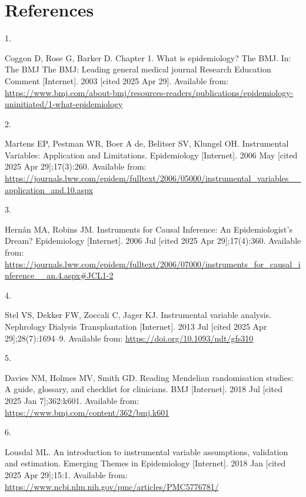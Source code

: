 \documentclass[
]{article}
\newlength{\cslhangindent}
\newlength{\csllabelwidth}
\newenvironment{CSLReferences}[2] %
 {\begin{list}{}{%
  \setlength{\itemindent}{0pt}
  \setlength{\leftmargin}{0pt}
  \setlength{\parsep}{0pt}
  \ifodd #1
   \setlength{\leftmargin}{\cslhangindent}
   \setlength{\itemindent}{-1\cslhangindent}
  \fi
  \setlength{\itemsep}{#2\baselineskip}}}
 {\end{list}}
\newcommand{\CSLLeftMargin}[1]{\parbox[t]{\csllabelwidth}{\strut#1\strut}}
\newcommand{\CSLRightInline}[1]{\parbox[t]{\linewidth - \csllabelwidth}{\strut#1\strut}}
\begin{document}
\section{References}\label{references}

\label{refs}
\begin{CSLReferences}{0}{1}
\CSLLeftMargin{1. }%
\CSLRightInline{Coggon D, Rose G, Barker D. Chapter 1. {What} is epidemiology? {\textbar} {The} {BMJ}. In: The {BMJ} {\textbar} {The} {BMJ}: Leading general medical journal {Research} {Education} {Comment} {[}Internet{]}. 2003 {[}cited 2025 Apr 29{]}. Available from: \url{https://www.bmj.com/about-bmj/resources-readers/publications/epidemiology-uninitiated/1-what-epidemiology}}

\CSLLeftMargin{2. }%
\CSLRightInline{Martens EP, Pestman WR, Boer A de, Belitser SV, Klungel OH. Instrumental {Variables}: {Application} and {Limitations}. Epidemiology {[}Internet{]}. 2006 May {[}cited 2025 Apr 29{]};17(3):260. Available from: \url{https://journals.lww.com/epidem/fulltext/2006/05000/instrumental_variables__application_and.10.aspx}}

\CSLLeftMargin{3. }%
\CSLRightInline{Hernán MA, Robins JM. Instruments for {Causal} {Inference}: {An} {Epidemiologist}'s {Dream}? Epidemiology {[}Internet{]}. 2006 Jul {[}cited 2025 Apr 29{]};17(4):360. Available from: \url{https://journals.lww.com/epidem/fulltext/2006/07000/instruments_for_causal_inference__an.4.aspx\#JCL1-2}}

\CSLLeftMargin{4. }%
\CSLRightInline{Stel VS, Dekker FW, Zoccali C, Jager KJ. Instrumental variable analysis. Nephrology Dialysis Transplantation {[}Internet{]}. 2013 Jul {[}cited 2025 Apr 29{]};28(7):1694--9. Available from: \url{https://doi.org/10.1093/ndt/gfs310}}

\CSLLeftMargin{5. }%
\CSLRightInline{Davies NM, Holmes MV, Smith GD. Reading {Mendelian} randomisation studies: A guide, glossary, and checklist for clinicians. BMJ {[}Internet{]}. 2018 Jul {[}cited 2025 Jan 7{]};362:k601. Available from: \url{https://www.bmj.com/content/362/bmj.k601}}

\CSLLeftMargin{6. }%
\CSLRightInline{Lousdal ML. An introduction to instrumental variable assumptions, validation and estimation. Emerging Themes in Epidemiology {[}Internet{]}. 2018 Jan {[}cited 2025 Apr 29{]};15:1. Available from: \url{https://www.ncbi.nlm.nih.gov/pmc/articles/PMC5776781/}}


\end{CSLReferences}
\end{document}
